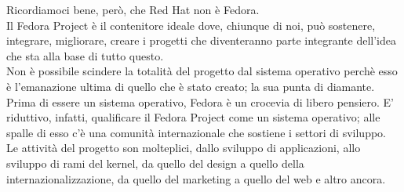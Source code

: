 Ricordiamoci bene, però, che Red Hat non è Fedora.\\

Il Fedora Project è il contenitore ideale dove, chiunque di noi, può sostenere, integrare,
migliorare, creare i progetti che diventeranno parte integrante dell'idea che
sta alla base di tutto questo.\\


Non è possibile scindere la totalità del progetto dal sistema operativo perchè
esso è l'emanazione ultima di quello che è stato creato; la sua punta di
diamante.\\

Prima di essere un sistema operativo, Fedora è un crocevia di libero pensiero.
E' riduttivo, infatti, qualificare il Fedora Project come un sistema operativo;
alle spalle di esso c'è una comunità internazionale che sostiene i settori di
sviluppo.\\

Le attività del progetto son molteplici, dallo sviluppo di applicazioni, allo
sviluppo di rami del kernel, da quello del design a quello della
internazionalizzazione, da quello del marketing a quello del web e altro ancora.\\

